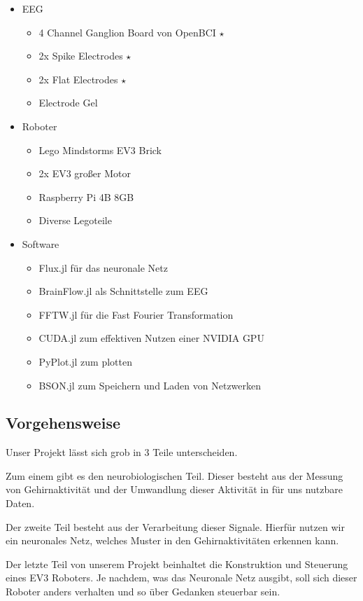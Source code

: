 \documentclass{scrartcl}
\begin{document}
	\begin{itemize}
		\item EEG
		\begin{itemize}
			\item 4 Channel Ganglion Board von OpenBCI $\star$
			\item 2x Spike Electrodes  $\star$
			\item 2x Flat Electrodes $\star$
			\item Electrode Gel 
		\end{itemize}

		\item Roboter
		\begin{itemize}
			\item Lego Mindstorms EV3 Brick
			\item 2x EV3 großer Motor
			\item Raspberry Pi 4B 8GB
			\item Diverse Legoteile
		\end{itemize}

		\item Software
		\begin{itemize}
			\item Flux.jl für das neuronale Netz
			\item BrainFlow.jl als Schnittstelle zum EEG
			\item FFTW.jl für die Fast Fourier Transformation
			\item CUDA.jl zum effektiven Nutzen einer NVIDIA GPU
			\item PyPlot.jl zum plotten
			\item BSON.jl zum Speichern und Laden von Netzwerken
		\end{itemize}
	\end{itemize}

	\subsection{Vorgehensweise}

	Unser Projekt lässt sich grob in 3 Teile unterscheiden. 

	Zum einem gibt es den neurobiologischen Teil. Dieser besteht aus der Messung von Gehirnaktivität und der Umwandlung dieser Aktivität in für uns nutzbare Daten. 

	Der zweite Teil besteht aus der Verarbeitung dieser Signale. Hierfür nutzen wir ein neuronales Netz, welches Muster in den Gehirnaktivitäten erkennen kann. 

	Der letzte Teil von unserem Projekt beinhaltet die Konstruktion und Steuerung eines EV3 Roboters. Je nachdem, was das Neuronale Netz ausgibt, soll sich dieser Roboter anders verhalten und so über Gedanken steuerbar sein. 
\end{document}

